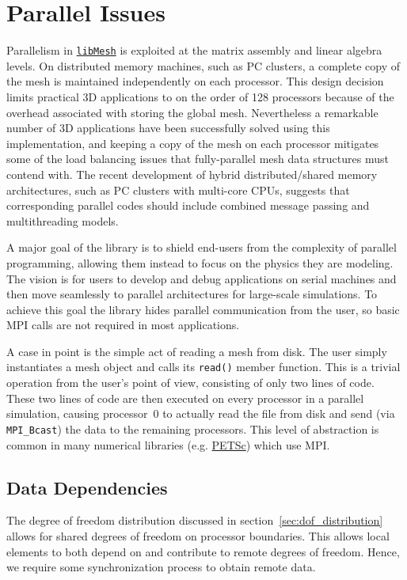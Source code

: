 \documentclass[global,twocolumn,final]{svjour}
\newcommand{\libMesh}{\href{http://libmesh.sourceforge.net}{\texttt{lib\-Mesh}}}
\newcommand{\PETSc}{\href{http://www-unix.mcs.anl.gov/petsc/petsc-2}{PETSc}}
\begin{document}
\section{Parallel Issues\label{sec:parallel_issues}}
Parallelism in \libMesh{} is exploited at the matrix
assembly and linear
algebra levels.  On distributed memory machines, such as PC clusters,
a complete copy of the mesh is maintained independently on each
processor. This design decision limits practical 3D
applications to on
the order of 128 processors because of the overhead associated with
storing the global mesh.  Nevertheless a remarkable number of 3D
applications have been successfully solved using this implementation,
and keeping a copy of the mesh on each processor mitigates some of the
load balancing issues that fully-parallel mesh data structures must
contend with.  The recent development of hybrid distributed/shared
memory architectures, such as PC clusters with multi-core CPUs, 
suggests that corresponding parallel codes should include
combined message passing and multithreading models.
 
A major goal of the library is to shield end-users from the
complexity of parallel programming, allowing them instead to focus on
the physics they are modeling.  The vision is for users to develop and
debug applications on serial machines and then move seamlessly to
parallel architectures for large-scale simulations.  To achieve this
goal the library hides parallel communication from the user, so
basic MPI calls are not required in most applications.

A case in point is the simple act of reading a mesh from disk.  The
user simply instantiates a mesh object and calls its \texttt{read()}
member function.  This is a trivial operation from the user's point of
view, consisting of only two lines of code.  These two lines of code
are then executed on every processor in a parallel simulation, causing
processor~0 to actually read the file from disk and send
(via \texttt{MPI\_Bcast}) the data
to the remaining processors.  This level of abstraction is common in
many numerical libraries (e.g. \PETSc{}) which use MPI.

\subsection{Data Dependencies\label{sec:data_dependencies}}
The degree of freedom distribution discussed in
section~\ref{sec:dof_distribution} allows for shared degrees of
freedom on processor boundaries.  This allows local elements to
both depend on and contribute to remote degrees of freedom.  Hence, we
require some synchronization process to obtain remote
data.
\end{document}
